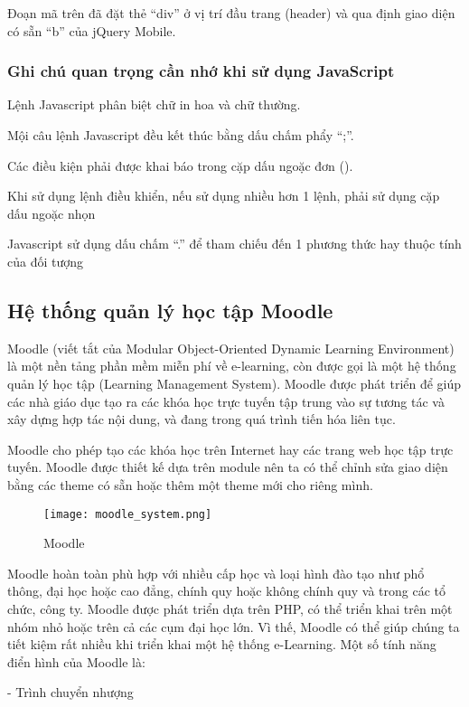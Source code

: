 Đoạn mã trên đã đặt thẻ “div” ở vị trí đầu trang (header) và qua định giao diện có sẵn “b” của jQuery Mobile.

\subsubsection{Ghi chú quan trọng cần nhớ khi sử dụng JavaScript}

Lệnh Javascript phân biệt chữ in hoa và chữ thường.

Mội câu lệnh Javascript đều kết thúc bằng dấu chấm phẩy “;”.

Các điều kiện phải được khai báo trong cặp dấu ngoặc đơn ().

Khi sử dụng lệnh điều khiển, nếu sử dụng nhiều hơn 1 lệnh, phải sử dụng cặp dấu ngoặc nhọn {}

Javascript sử dụng dấu chấm “.” để tham chiếu đến 1 phương thức hay thuộc tính của đối tượng 

\subsection{Hệ thống quản lý học tập Moodle}

Moodle (viết tắt của Modular Object-Oriented Dynamic Learning Environment) là một nền tảng phần mềm miễn phí về e-learning, còn được gọi là một hệ thống quản lý học tập (Learning Management System). Moodle được phát triển để giúp các nhà giáo dục tạo ra các khóa học trực tuyến tập trung vào sự tương tác và xây dựng hợp tác nội dung, và đang trong quá trình tiến hóa liên tục.

Moodle cho phép tạo các khóa học trên Internet hay các trang web học tập trực tuyến. Moodle được thiết kế dựa trên module nên ta có thể chỉnh sửa giao diện bằng các theme có sẵn hoặc thêm một theme mới cho riêng mình.

\begin{figure}[!htb] 
\centering
\texttt{[image: moodle\_system.png]}
\caption{Moodle}
\end{figure}

Moodle hoàn toàn phù hợp với nhiều cấp học và loại hình đào tạo như phổ thông, đại học hoặc cao đẳng, chính quy hoặc không chính quy và trong các tổ chức, công ty.
Moodle được phát triển dựa trên PHP, có thể triển khai trên một nhóm nhỏ hoặc trên cả các cụm đại học lớn. Vì thế, Moodle có thể giúp chúng ta tiết kiệm rất nhiều khi triển khai một hệ thống e-Learning.
Một số tính năng điển hình của Moodle là:

\quad - Trình chuyển nhượng

